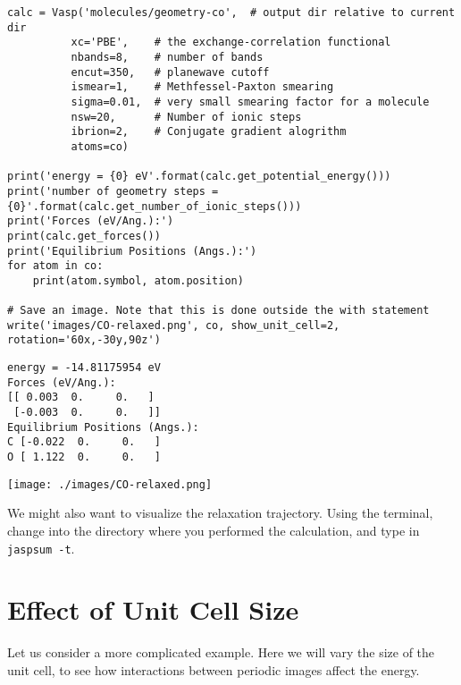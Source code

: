 \documentclass[11pt]{article}
\begin{document}
\begin{verbatim}
calc = Vasp('molecules/geometry-co',  # output dir relative to current dir
          xc='PBE',    # the exchange-correlation functional
          nbands=8,    # number of bands
          encut=350,   # planewave cutoff
          ismear=1,    # Methfessel-Paxton smearing
          sigma=0.01,  # very small smearing factor for a molecule
          nsw=20,      # Number of ionic steps
          ibrion=2,    # Conjugate gradient alogrithm
          atoms=co)

print('energy = {0} eV'.format(calc.get_potential_energy()))
print('number of geometry steps = {0}'.format(calc.get_number_of_ionic_steps()))
print('Forces (eV/Ang.):')
print(calc.get_forces())
print('Equilibrium Positions (Angs.):')
for atom in co:
    print(atom.symbol, atom.position)
    
# Save an image. Note that this is done outside the with statement
write('images/CO-relaxed.png', co, show_unit_cell=2, rotation='60x,-30y,90z')
\end{verbatim}

\begin{verbatim}
energy = -14.81175954 eV
Forces (eV/Ang.):
[[ 0.003  0.     0.   ]
 [-0.003  0.     0.   ]]
Equilibrium Positions (Angs.):
C [-0.022  0.     0.   ]
O [ 1.122  0.     0.   ]
\end{verbatim}

\begin{center}
\texttt{[image: ./images/CO-relaxed.png]}
\end{center}


We might also want to visualize the relaxation trajectory. Using the terminal, change into the directory where you performed the calculation, and type in \texttt{jaspsum -t}.


\section{Effect of Unit Cell Size}
\label{sec:org03c3e26}

Let us consider a more complicated example. Here we will vary the size of the unit cell, to see how interactions between periodic images affect the energy.
\end{document}
